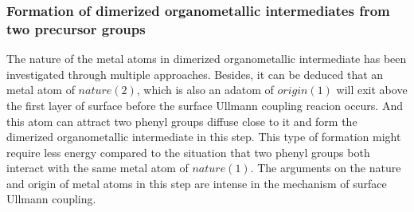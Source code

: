 \documentclass[%
 reprint,
 amsmath,amssymb,
 aps,
prb,
]{revtex4-2}
\begin{document}
\subsubsection{Formation of dimerized organometallic intermediates from two precursor groups}

The nature of the metal atoms in dimerized organometallic intermediate has been investigated through multiple approaches. Besides, it can be deduced that an metal atom of $nature(2)$, which is also an adatom of $origin(1)$ will exit above the first layer of surface before the surface Ullmann coupling reacion occurs. And this atom can attract two phenyl groups diffuse close to it and form the dimerized organometallic intermediate in this step. This type of formation might require less energy compared to the situation that two phenyl groups both interact with the same metal atom of $nature(1)$. The arguments on the nature and origin of metal atoms in this step are intense in the mechanism of surface Ullmann coupling.
\end{document}
